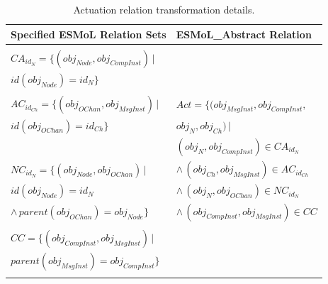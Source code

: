 \begin{table}
\centering

\begin{tabular}[width=0.5\columnwidth]{ | l | l | }
 \hline
 \textbf{Specified ESMoL Relation Sets} & \textbf{ESMoL\_Abstract Relation} \\
 \hline \hline
                                                                        & \\
 $CA_{id_N} = \{ (obj_{Node}, obj_{CompInst} ) \, |$                    & \\
 \hspace{1.7cm} $ id(obj_{Node}) = id_N \} $                            & \\
                                                                        & \\
 $AC_{id_{Ch}} = \{ (obj_{OChan}, obj_{MsgInst} ) \, |$                 & 
$ Act = \{(obj_{MsgInst}, obj_{CompInst}, $  \\
 \hspace{1.6cm} $id(obj_{OChan}) = id_{Ch} \} $                         & 
\hspace{1.3cm} $obj_{N}, obj_{Ch}) \, |$ \\
                                                                        &  
\hspace{0.8cm} $(obj_{N}, obj_{CompInst}) \in CA_{id_N}$ \\
 $NC_{id_N} = \{ (obj_{Node}, obj_{OChan}) \, | $                       & 
\hspace{0.5cm} $ \wedge \, (obj_{Ch}, obj_{MsgInst}) \in AC_{id_{Ch}}$ \\
 \hspace{1.35cm} $id(obj_{Node}) = id_N $                               &
\hspace{0.5cm} $ \wedge \, (obj_{N}, obj_{OChan}) \in NC_{id_N}$ \\ 
 \hspace{1cm} $ \wedge \, parent(obj_{OChan} ) = obj_{Node} \}$         &
\hspace{0.5cm} $ \wedge \, (obj_{CompInst}, obj_{MsgInst}) \in CC $ \\
                                                                        & \\
 $CC = \{ (obj_{CompInst}, obj_{MsgInst} ) \, | $                       & \\
 \hspace{0.7cm} $parent(obj_{MsgInst} ) = obj_{CompInst} \}$            & \\ 
                                                                        & \\
 \hline
\end{tabular}
	\caption{Actuation relation transformation details.}
	\label{tab:actuation}
\end{table}

